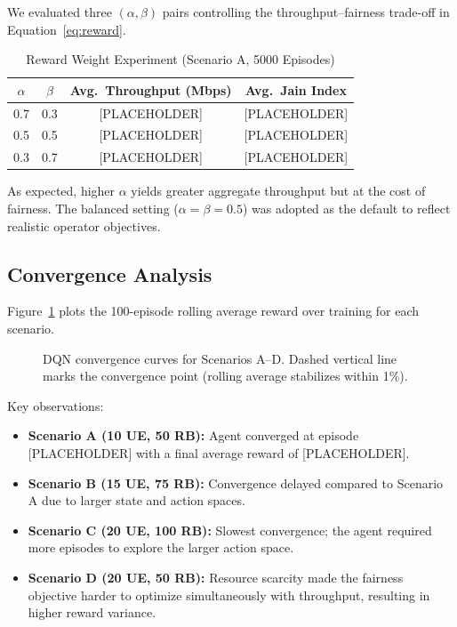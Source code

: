 We evaluated three $(\alpha, \beta)$ pairs controlling the throughput--fairness
trade-off in Equation~\eqref{eq:reward}.

\begin{table}[h]
\centering
\caption{Reward Weight Experiment (Scenario A, 5000 Episodes)}
\begin{tabular}{cccc}
\hline
$\alpha$ & $\beta$ & \textbf{Avg.\ Throughput (Mbps)} & \textbf{Avg.\ Jain Index} \\
\hline
0.7 & 0.3 & [PLACEHOLDER] & [PLACEHOLDER] \\
0.5 & 0.5 & [PLACEHOLDER] & [PLACEHOLDER] \\
0.3 & 0.7 & [PLACEHOLDER] & [PLACEHOLDER] \\
\hline
\end{tabular}
\label{tab:reward_sweep}
\end{table}

As expected, higher $\alpha$ yields greater aggregate throughput but at the
cost of fairness. The balanced setting ($\alpha = \beta = 0.5$) was adopted as
the default to reflect realistic operator objectives.

\subsection{Convergence Analysis}

Figure~\ref{fig:convergence} plots the 100-episode rolling average reward
over training for each scenario.

\begin{figure}[h]
    \centering
    \caption{DQN convergence curves for Scenarios A–D.
             Dashed vertical line marks the convergence point
             (rolling average stabilizes within 1\%).}
    \label{fig:convergence}
\end{figure}

Key observations:
\begin{itemize}
    \item \textbf{Scenario A (10 UE, 50 RB):} Agent converged at episode
          [PLACEHOLDER] with a final average reward of [PLACEHOLDER].
    \item \textbf{Scenario B (15 UE, 75 RB):} Convergence delayed compared to
          Scenario A due to larger state and action spaces.
    \item \textbf{Scenario C (20 UE, 100 RB):} Slowest convergence; the
          agent required more episodes to explore the larger action space.
    \item \textbf{Scenario D (20 UE, 50 RB):} Resource scarcity made
          the fairness objective harder to optimize simultaneously with
          throughput, resulting in higher reward variance.
\end{itemize}

